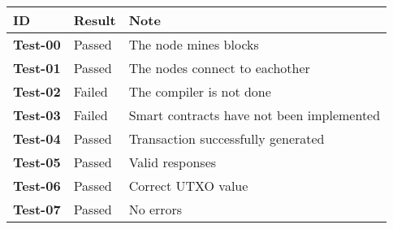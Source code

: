 \documentclass[../documentation.tex]{subfiles}
\begin{document}
\bgroup{}
\def\arraystretch{1.25}
\begin{center}
    \begin{tabular}{ |l|l|l| }
        \hline
        \textbf{ID} & Result & Note \\
        \hline
        \textbf{Test-00} & \color{darkgreen} Passed & The node mines blocks \\
        \hline
        \textbf{Test-01} & \color{darkgreen} Passed & The nodes connect to eachother \\
        \hline
        \textbf{Test-02} & \color{red} Failed & The compiler is not done \\
        \hline
        \textbf{Test-03} & \color{red} Failed & Smart contracts have not been implemented \\
        \hline
        \textbf{Test-04} & \color{darkgreen} Passed & Transaction successfully generated\\
        \hline
        \textbf{Test-05} & \color{darkgreen} Passed & Valid responses \\
        \hline
        \textbf{Test-06} & \color{darkgreen} Passed & Correct UTXO value \\
        \hline
        \textbf{Test-07} & \color{darkgreen} Passed & No errors \\
        \hline
    \end{tabular}
\end{center}
\egroup{}
\end{document}
